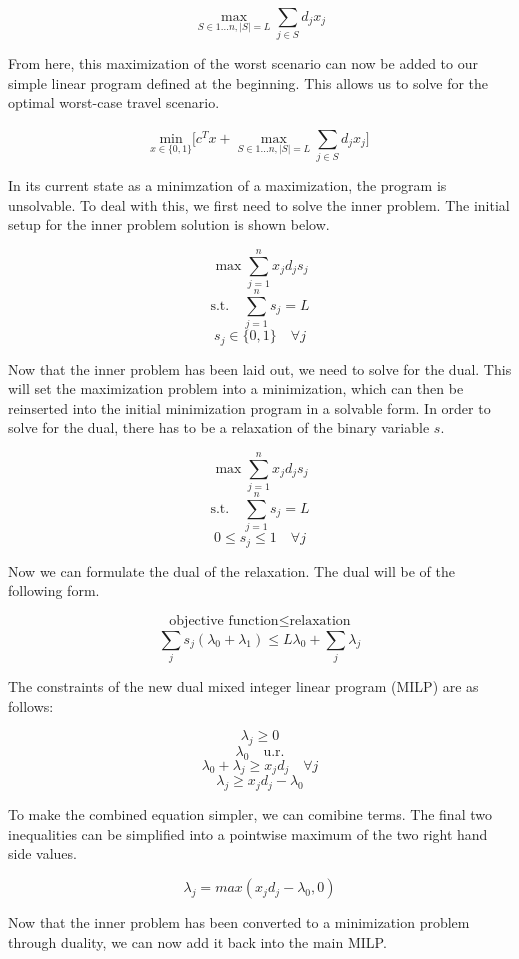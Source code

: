\documentclass{article}
\begin{document}
$$
\max_{S \in 1 ... n, |S| = L} \sum_{j \in S}^{}d_{j}x_{j}
$$

From here, this maximization of the worst scenario can now be added to our simple linear program defined at the beginning. This allows us to solve for the optimal worst-case travel scenario.

$$
\underset{x \in \{0,1\}}{\textrm{min}} \lbrack c^T x + \max_{S \in 1 ... n, |S| = L} \sum_{j \in S}^{}d_{j}x_{j} \rbrack
$$

In its current state as a minimzation of a maximization, the program is unsolvable. To deal with this, we first need to solve the inner problem. The initial setup for the inner problem solution is shown below.

$$
\max \sum_{j = 1}^{n} x_{j}d_{j}s_{j}
$$
$$
\textrm{s.t.} \quad \sum_{j =1}^{n} s_{j} = L
$$
$$
s_{j} \in \{0,1\} \quad \forall j
$$

Now that the inner problem has been laid out, we need to solve for the dual. This will set the maximization problem into a minimization, which can then be reinserted into the initial minimization program in a solvable form. In order to solve for the dual, there has to be a relaxation of the binary variable $s$.

$$
\max \sum_{j = 1}^{n} x_{j}d_{j}s_{j}
$$
$$
\textrm{s.t.} \quad \sum_{j =1}^{n} s_{j} = L
$$
$$
0 \leq s_{j} \leq 1 \quad \forall j
$$

Now we can formulate the dual of the relaxation. The dual will be of the following form.

$$ \textrm{objective function} \leq \textrm{relaxation}
$$
$$
\sum_{j}^{} s_{j} \left( \lambda_0 + \lambda_1 \right) \leq L \lambda_0 + \sum_{j}^{} \lambda_j
$$

The constraints of the new dual mixed integer linear program (MILP) are as follows:

$$
\lambda_j \geq 0
$$
$$
\lambda_0 \quad \textrm{u.r.}
$$
$$
\lambda_0 + \lambda_j \geq x_j d_j \quad \forall j
$$
$$
\lambda_j \geq x_j d_j - \lambda_0
$$

To make the combined equation simpler, we can comibine terms. The final two inequalities can be simplified into a pointwise maximum of the two right hand side values.

$$
\lambda_j = max \left(x_j d_j - \lambda_0 ,0\right)
$$


Now that the inner problem has been converted to a minimization problem through duality, we can now add it back into the main MILP.
\end{document}
